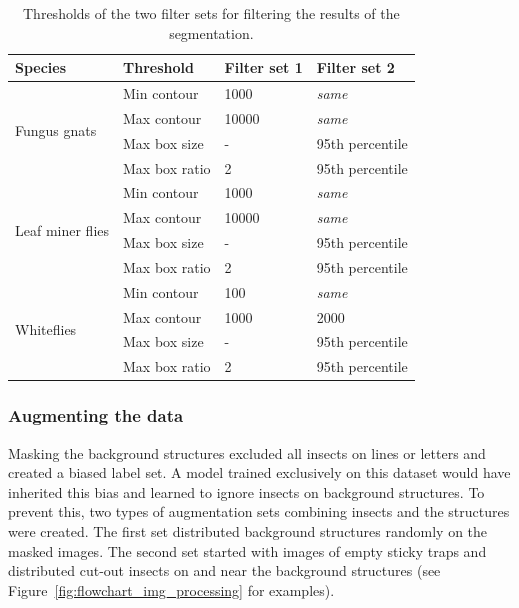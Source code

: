 \documentclass[12pt, a4paper]{article}
\begin{document}
\begin{table}[!t]
\centering
\begin{tabular}{|l|l|l|l|}
\hline
\textbf{Species} & \textbf{Threshold} & \textbf{Filter set 1} & \textbf{Filter set 2} \\ \hline
\multirow{4}{*}{Fungus gnats} 
    & Min contour   & 1000 & \textit{same}  \\ \cline{2-4}
    & Max contour   & 10000 & \textit{same}  \\ \cline{2-4}
    & Max box size  & - & 95th percentile \\ \cline{2-4}
    & Max box ratio & 2  & 95th percentile \\ \hline
\multirow{4}{*}{Leaf miner flies} 
    & Min contour   & 1000 & \textit{same} \\ \cline{2-4}
    & Max contour   & 10000 & \textit{same}  \\ \cline{2-4}
    & Max box size  & -  & 95th percentile \\ \cline{2-4}
    & Max box ratio & 2 & 95th percentile  \\ \hline
\multirow{4}{*}{Whiteflies} 
    & Min contour   & 100 & \textit{same}  \\ \cline{2-4}
    & Max contour   & 1000 & 2000  \\ \cline{2-4}
    & Max box size  & - &  95th percentile  \\ \cline{2-4}
    & Max box ratio & 2  & 95th percentile \\ \hline
\end{tabular}
\caption{Thresholds of the two filter sets for filtering the results of the segmentation.}
\label{tab:filter_parameters}
\end{table}


\subsubsection{Augmenting the data}
\label{sec:augmentation}

Masking the background structures excluded all insects on lines or letters and created a biased label set. A model trained exclusively on this dataset would have inherited this bias and learned to ignore insects on background structures. To prevent this, two types of augmentation sets combining insects and the structures were created. The first set distributed background structures randomly on the masked images. The second set started with images of empty sticky traps and distributed cut-out insects on and near the background structures (see Figure~\ref{fig:flowchart_img_processing} for examples).
\end{document}
